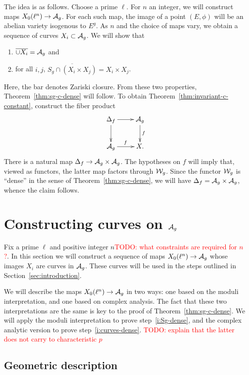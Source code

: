 \documentclass{amsart}
\begin{document}
The idea is as follows. Choose a prime $\ell$. For $n$ an integer, we will construct maps $X_0(\ell^n) \to \mathcal{A}_g$. For each such map, the image of a point $(E, \phi)$ will be an abelian variety isogenous to $E^g$. As $n$ and the choice of maps vary, we obtain a sequence of curves $X_i \subset \mathcal{A}_g$. We will show that
\begin{enumerate}
    \item\label{i:curves-dense} $\overline{\cup X_i} = \mathcal{A}_g$ and
    \item\label{i:Sg-dense} for all $i,j$, $\overline{S_g \cap (X_i \times X_j)} = X_i \times X_j$.
\end{enumerate}
Here, the bar denotes Zariski closure. From these two properties, Theorem~\ref{thm:sg-c-dense} will follow. To obtain Theorem~\ref{thm:invariant-c-constant}, construct the fiber product
\[
  \xymatrix{
    \df \ar[r] \ar[d] & \ag \ar[d]^f \\
    \ag \ar[r]^f & X.
  }
\]
There is a natural map $\Delta_f \to \mathcal{A}_g \times \mathcal{A}_g$. The hypotheses on $f$ will imply that, viewed as functors, the latter map factors through $\mathcal{W}_g$. Since the functor $\mathcal{W}_g$ is ``dense'' in the sense of Theorem~\ref{thm:sg-c-dense}, we will have $\Delta_f = \mathcal{A}_g \times \mathcal{A}_g$, whence the claim follows.


\section{Constructing curves on $\mathcal{A}_g$}
\label{sec:curves-on-Ag}

Fix a prime $\ell$ and positive integer $n$\textcolor{red}{TODO: what constraints are required for $n$?}. In this section we will construct a sequence of maps $X_0(\ell^n) \to \mathcal{A}_g$ whose images $X_i$ are curves in $\mathcal{A}_g$. These curves will be used in the steps outlined in Section~\ref{sec:introduction}.

We will describe the maps $X_0(\ell^n) \to \mathcal{A}_g$ in two ways: one based on the moduli interpretation, and one based on complex analysis. The fact that these two interpretations are the same is key to the proof of Theorem~\ref{thm:sg-c-dense}. We will apply the moduli interpretation to prove step~\ref{i:Sg-dense}, and the complex analytic version to prove step~\ref{i:curves-dense}. \textcolor{red}{TODO: explain that the latter does not carry to characteristic $p$}

\subsection{Geometric description}
\label{sec:geo-desc}
\end{document}
